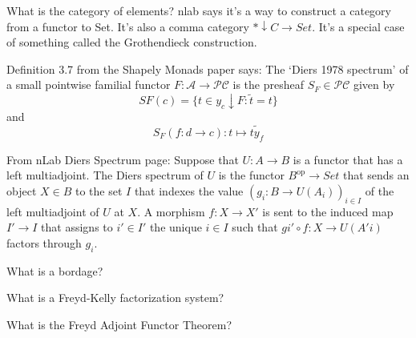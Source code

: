 \documentclass[11pt,noamsfonts]{amsart}
\DeclareMathOperator{\op}{op}
\begin{document}
What is the category of elements? nlab says it's a way to construct a category from a functor to Set. It's also a comma category \( * \downarrow C \to Set \). It's a special case of something called the Grothendieck construction. 

Definition 3.7 from the Shapely Monads paper says: The `Diers 1978 spectrum' of a small pointwise familial functor 
\(F : \mathcal{A} \to \mathcal{PC}\) is the presheaf \(S_F \in \mathcal{PC}\) given by
\[
SF (c) = \{ t \in y_c \downarrow F : \tilde{t} = t \}
\]
and
\[
S_F (f : d \to c) : t \mapsto \tilde{t y_f}
\]

From nLab Diers Spectrum page: Suppose that \(U: A \to B\)
is a functor that has a left multiadjoint.
The Diers spectrum of \(U\) is the functor
\(B^{\op} \to Set\) that sends an object
\( X \in B \) to the set
\( I \) that indexes the value
\( (g_i : B \to U(A_i))_{i \in I} \)
of the left multiadjoint of \( U \) at
\( X \). A morphism
\( f : X \to X' \) is sent to the induced map \( I' \to I \) that assigns to \( i' \in I' \) the unique \( i \in I \) such that \( g i' \circ f : X \to U( A' i ) \) factors through \( g_i \).


What is a bordage?

What is a Freyd-Kelly factorization system?

What is the Freyd Adjoint Functor Theorem?
\end{document}
